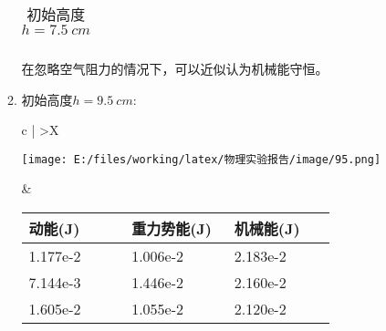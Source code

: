 \documentclass[UTF8]{article}
\begin{document}
\begin{enumerate}
\begin{enumerate}[left=2em, label=\arabic*)]
\begin{table}[H]
\begin{tabularx}{\textwidth}{
                                    c |
                                    >{\centering\arraybackslash}X
                                }
                                \\ \hline
                                \end{tabularx}
                                \caption{初始高度$h=\SI{7.5}{cm}$}
                                \label{form:75}
                            \end{table}
                            在忽略空气阻力的情况下，可以近似认为机械能守恒。

                        
                        \item 初始高度$h=\SI{9.5}{cm}$:
                        \begin{table}[H]
                            \centering
                            \begin{tabularx}{\textwidth}{
                                c |
                                >{\centering\arraybackslash}X
                            }
                            \hline
                            \begin{minipage}{0.45\textwidth}
                                \centering
                                \texttt{[image: E:/files/working/latex/物理实验报告/image/95.png]}
                            \end{minipage}
                            &
                            \begin{minipage}{\linewidth}
                                \begin{tabular}{
                                    || >{\centering\arraybackslash}p{0.248\linewidth}
                                    | >{\centering\arraybackslash}p{0.248\linewidth}
                                    | >{\centering\arraybackslash}p{0.248\linewidth}
                                    ||
                                }
                                    \hline
                                    动能(J) & 重力势能(J) & 机械能(J)\\ \hline
                                    1.177e-2 & 1.006e-2 & 2.183e-2 \\ \hline
                                    7.144e-3 & 1.446e-2 & 2.160e-2 \\ \hline
                                    1.605e-2 & 1.055e-2 & 2.120e-2\\ \hline
                                \end{tabular}                                    
                            \end{minipage}


\end{tabularx}
\end{table}
\end{enumerate}
\end{enumerate}
\end{document}
